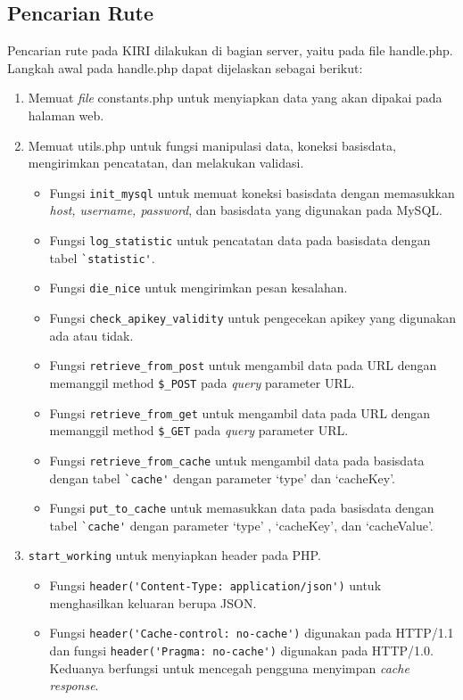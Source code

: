 \subsection{Pencarian Rute}
Pencarian rute pada KIRI dilakukan di bagian server, yaitu pada file handle.php. Langkah awal pada handle.php dapat dijelaskan sebagai berikut:
\begin{enumerate}
	\item Memuat \textit{file} constants.php untuk menyiapkan data yang akan dipakai pada halaman web.
	\item Memuat utils.php untuk fungsi manipulasi data, koneksi basisdata, mengirimkan pencatatan, dan melakukan validasi.
	\begin{itemize}
		\item Fungsi \verb!init_mysql! untuk memuat koneksi basisdata dengan memasukkan \textit{host, username, password}, dan basisdata yang digunakan pada MySQL.
		\item Fungsi \verb!log_statistic! untuk pencatatan data pada basisdata dengan tabel \verb!`statistic'!.
		\item Fungsi \verb!die_nice! untuk mengirimkan pesan kesalahan.
		\item Fungsi \verb!check_apikey_validity! untuk pengecekan apikey yang digunakan ada atau tidak.
		\item Fungsi \verb!retrieve_from_post! untuk mengambil data pada URL dengan memanggil method \verb!$_POST! pada \textit{query} parameter URL.
		\item Fungsi \verb!retrieve_from_get! untuk mengambil data pada URL dengan memanggil method \verb!$_GET! pada \textit{query} parameter URL.
		\item Fungsi \verb!retrieve_from_cache! untuk mengambil data pada basisdata dengan tabel \verb!`cache'! dengan parameter `type' dan `cacheKey'.
		\item Fungsi \verb!put_to_cache! untuk memasukkan data pada basisdata dengan tabel \verb!`cache'! dengan parameter `type' , `cacheKey', dan `cacheValue'.
	\end{itemize}
	\item \verb!start_working! untuk menyiapkan header pada PHP.
	\begin{itemize}
		\item Fungsi \verb!header('Content-Type: application/json')! untuk menghasilkan keluaran berupa JSON.
		\item Fungsi \verb!header('Cache-control: no-cache')! digunakan pada HTTP/1.1 dan fungsi \verb!header('Pragma: no-cache')! digunakan pada HTTP/1.0. Keduanya berfungsi untuk mencegah pengguna menyimpan \textit{cache response}.

\end{itemize}
\end{enumerate}
